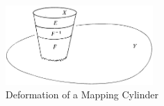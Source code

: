 \documentclass[letterpaper, 11pt, oneside]{book}
\begin{document}
\begin{pf}

  \begin{figure}[ht]
    \centering
    \includegraphics[width=0.5\textwidth]{figs/Mapping_Cylinder_Deformation.png}
    \caption{Deformation of a Mapping Cylinder~\cite{book:Bredon}}\label{fig:mapping_cylinder_deformation}
  \end{figure}
\end{pf}

\clearpage
\end{document}

